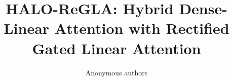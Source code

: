 \title{\textbf{HALO-ReGLA: Hybrid Dense-Linear Attention with Rectified Gated Linear Attention}}

\author{Anonymous authors}
